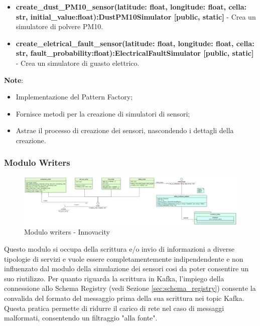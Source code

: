\begin{itemize}
\begin{itemize}
\begin{itemize}
    \item \textbf{create\_dust\_PM10\_sensor(latitude: float, longitude: float, cella: str, initial\_value:float):DustPM10Simulator [public, static]} - Crea un simulatore di polvere PM10.
    \item \textbf{create\_eletrical\_fault\_sensor(latitude: float, longitude: float, cella: str, fault\_probability:float):ElectricalFaultSimulator [public, static]} - Crea un simulatore di guasto elettrico.
\end{itemize}
\textbf{Note}:
    \begin{itemize}
        \item Implementazione del Pattern Factory;
        \item Fornisce metodi per la creazione di simulatori di sensori;
        \item Astrae il processo di creazione dei sensori, nascondendo i dettagli della creazione.
    \end{itemize}
\end{itemize}
\end{itemize}

\subsubsection{Modulo Writers} \label{sec:writersModule}

\begin{figure}[H]
    \centering
    \includegraphics[width=1.1\textwidth]{../Images/SpecificaTecnica/writerModule.PNG}
    \caption{Modulo writers - Innovacity}
    \label{fig: writersModule}
\end{figure}

Questo modulo si occupa della scrittura e/o invio di informazioni a diverse tipologie di servizi e vuole essere completamentemente indipendendente e non influenzato dal modulo della simulazione dei sensori cosi da poter consentire un suo riutilizzo.
Per quanto riguarda la scrittura in Kafka, l'impiego della connessione allo Schema Registry (vedi Sezione \ref{sec:schema_registry}) consente la convalida del formato del messaggio prima della sua scrittura nei topic Kafka. Questa pratica permette di ridurre il carico di rete nel caso di messaggi malformati, consentendo un filtraggio "alla fonte".


